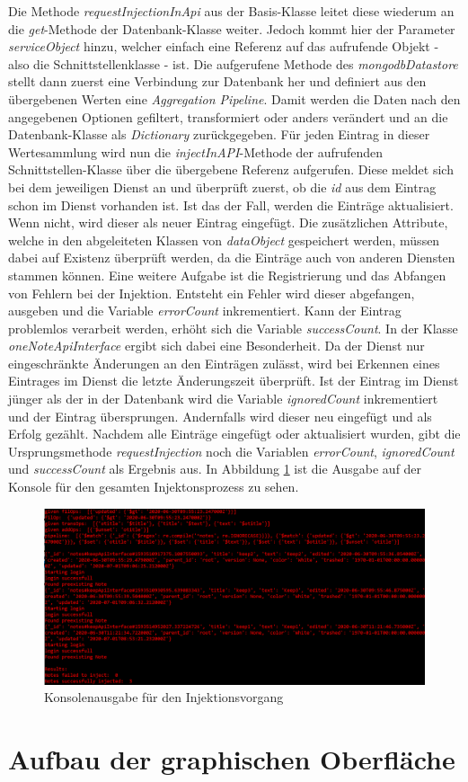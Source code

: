 Die Methode \textit{requestInjectionInApi} aus der Basis-Klasse leitet diese wiederum an die \textit{get}-Methode der Datenbank-Klasse weiter. Jedoch kommt hier der Parameter \textit{serviceObject} hinzu, welcher einfach eine Referenz auf das aufrufende Objekt - also die Schnittstellenklasse - ist. Die aufgerufene Methode des \textit{mongodbDatastore} stellt dann zuerst eine Verbindung zur Datenbank her und definiert aus den übergebenen Werten eine \textit{Aggregation Pipeline}. Damit werden die Daten nach den angegebenen Optionen gefiltert, transformiert oder anders verändert und an die Datenbank-Klasse als \textit{Dictionary} zurückgegeben. Für jeden Eintrag in dieser Wertesammlung wird nun die \textit{injectInAPI}-Methode der aufrufenden Schnittstellen-Klasse über die übergebene Referenz aufgerufen. Diese meldet sich bei dem jeweiligen Dienst an und überprüft zuerst, ob die \textit{id} aus dem Eintrag schon im Dienst vorhanden ist. Ist das der Fall, werden die Einträge aktualisiert. Wenn nicht, wird dieser als neuer Eintrag eingefügt. Die zusätzlichen Attribute, welche in den abgeleiteten Klassen von \textit{dataObject} gespeichert werden, müssen dabei auf Existenz überprüft werden, da die Einträge auch von anderen Diensten stammen können. Eine weitere Aufgabe ist die Registrierung und das Abfangen von Fehlern bei der Injektion. Entsteht ein Fehler wird dieser abgefangen, ausgeben und die Variable \textit{errorCount} inkrementiert. Kann der Eintrag problemlos verarbeit werden, erhöht sich die Variable \textit{successCount}. In der Klasse \textit{oneNoteApiInterface} ergibt sich dabei eine Besonderheit. Da der Dienst nur eingeschränkte Änderungen an den Einträgen zulässt, wird bei Erkennen eines Eintrages im Dienst die letzte Änderungszeit überprüft. Ist der Eintrag im Dienst jünger als der in der Datenbank wird die Variable \textit{ignoredCount} inkrementiert und der Eintrag übersprungen. Andernfalls wird dieser neu eingefügt und als Erfolg gezählt. Nachdem alle Einträge eingefügt oder aktualisiert wurden, gibt die Ursprungsmethode \textit{requestInjection} noch die Variablen \textit{errorCount}, \textit{ignoredCount} und \textit{successCount} als Ergebnis aus. In Abbildung \ref{fig:bspInj} ist die Ausgabe auf der Konsole für den gesamten Injektonsprozess zu sehen. 

\begin{figure}[H]
	\centering
	\includegraphics[width=1\textwidth]{Bilder/umsetzung/BeispielInject.png}
	\caption{Konsolenausgabe für den Injektionsvorgang}
	\label{fig:bspInj}
\end{figure}

\section{Aufbau der graphischen Oberfläche}